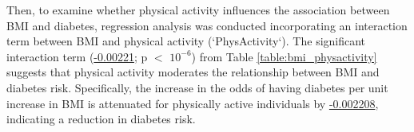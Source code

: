 \documentclass[11pt]{article}
\begin{document}
Then, to examine whether physical activity influences the association between BMI and diabetes, regression analysis was conducted incorporating an interaction term between BMI and physical activity (`PhysActivity`). The significant interaction term (\hyperlink{B4a}{-0.00221}; p $<$ \hyperlink{B4d}{$10^{-6}$}) from Table \ref{table:bmi_physactivity} suggests that physical activity moderates the relationship between BMI and diabetes risk. Specifically, the increase in the odds of having diabetes per unit increase in BMI is attenuated for physically active individuals by \hyperlink{results0}{-0.002208}, indicating a reduction in diabetes risk.

\begin{table}[h]
\caption{\protect\hyperlink{file-table-1-pkl}{Analysis of relationship between BMI and Diabetes moderated by Physical Activity}}
\label{table:bmi_physactivity}
\begin{threeparttable}
\renewcommand{\TPTminimum}{\linewidth}
\end{threeparttable}
\end{table}
\end{document}
